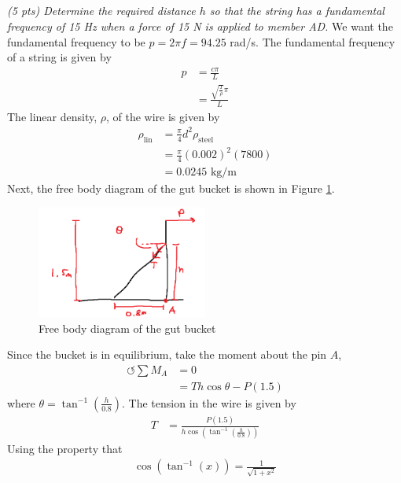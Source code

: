 \subsection{}
\textit{(5 pts) Determine the required distance $h$ so that the string has a fundamental frequency of 15 Hz when a force of 15 N is applied to member AD.}
We want the fundamental frequency to be $p = 2\pi f = 94.25$ rad/s. The fundamental frequency of a string is given by
\begin{align}
    p &= \frac{c \pi}{L} \nonumber \\
    &= \frac{\sqrt{\frac{T}{\rho}} \pi}{L} \label{eq:Q1 freq} 
\end{align}
The linear density, $\rho$, of the wire is given by
\begin{align*}
    \rho_{\text{lin}} &= \frac{\pi}{4} d^2 \rho_{\text{steel}} \\
    &= \frac{\pi}{4} (0.002)^2 (7800) \\
    &= 0.0245 \text{ kg/m}
\end{align*}
Next, the free body diagram of the gut bucket is shown in Figure \ref{fig:Q1 FBD}. 
\begin{figure}[h]
    \centering
    \includegraphics[width=0.5\textwidth]{Questions/Figures/Q1 FBD.png}
    \caption{Free body diagram of the gut bucket}
    \label{fig:Q1 FBD}
\end{figure}
Since the bucket is in equilibrium, take the moment about the pin $A$,
\begin{align*}
    \circlearrowleft \sum M_A &= 0 \\
    &= T h \cos\theta - P (1.5) 
\end{align*}
where $\theta = \tan^{-1} \left(\frac{h}{0.8}\right)$. The tension in the wire is given by
\begin{align*}
    T &= \frac{P (1.5)}{h \cos\left(\tan^{-1} \left(\frac{h}{0.8}\right)\right)} 
\end{align*}
Using the property that 
\begin{align*}
    \cos\left(\tan^{-1} (x)\right) = \frac{1}{\sqrt{1 + x^2}}
\end{align*}
